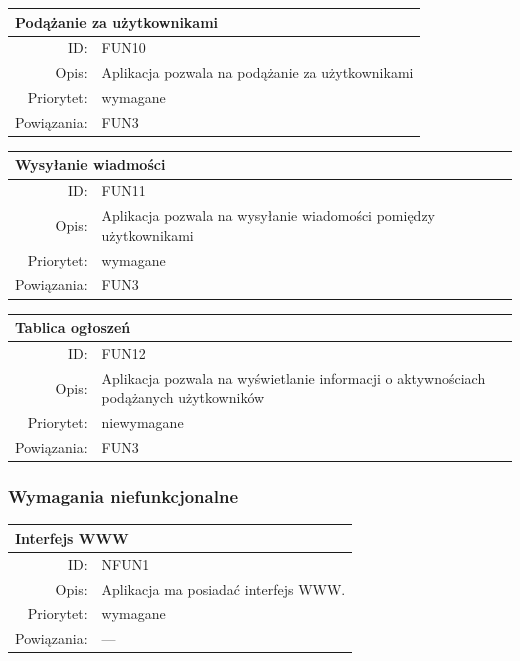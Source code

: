 \begin{center}
      \begin{tabular}{rp{10cm}}
	      \multicolumn{2}{l}{\textbf{Podążanie za użytkownikami}} \\
	      \hline
	      ID: & FUN10 \\
	      Opis: & Aplikacja pozwala na podążanie za użytkownikami \\
	      Priorytet: & wymagane \\
	      Powiązania: & FUN3 \\
    \end{tabular}
\end{center}

\begin{center}
      \begin{tabular}{rp{10cm}}
	      \multicolumn{2}{l}{\textbf{Wysyłanie wiadmości}} \\
	      \hline
	      ID: & FUN11 \\
	      Opis: & Aplikacja pozwala na wysyłanie wiadomości pomiędzy użytkownikami \\
	      Priorytet: & wymagane \\
	      Powiązania: & FUN3 \\
    \end{tabular}
\end{center}

\begin{center}
      \begin{tabular}{rp{10cm}}
	      \multicolumn{2}{l}{\textbf{Tablica ogłoszeń}} \\
	      \hline
	      ID: & FUN12 \\
	      Opis: & Aplikacja pozwala na wyświetlanie informacji o aktywnościach podążanych użytkowników \\
	      Priorytet: & niewymagane \\
	      Powiązania: & FUN3 \\
    \end{tabular}
\end{center}

\subsubsection{Wymagania niefunkcjonalne}
 \begin{center}
    \begin{tabular}{rp{10cm}}
      \multicolumn{2}{l}{\textbf{Interfejs WWW}} \\
      \hline
      ID: & NFUN1 \\
      Opis: & Aplikacja ma posiadać interfejs WWW. \\
      Priorytet: & wymagane \\
      Powiązania: & --- \\
    \end{tabular}
    \end{center}


